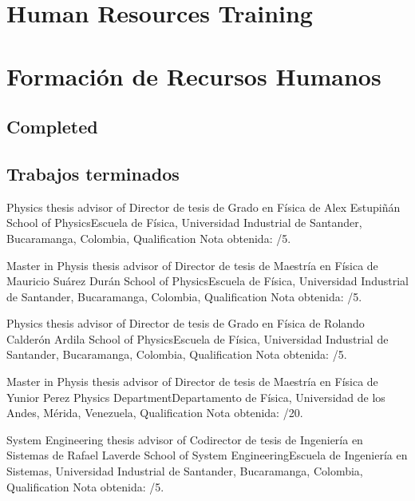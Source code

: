 \ifeng
\section*{Human Resources Training}
\else
\section*{Formación de Recursos Humanos}
\fi


\ifeng
\subsection*{Completed}
\else
\subsection*{Trabajos terminados}
\fi

\ifeng
Physics thesis advisor of
\else
Director de tesis de Grado en Física de
\fi
Alex Estupiñán \at \ifeng School of Physics\else Escuela de Física\fi, Universidad Industrial de Santander, Bucaramanga, Colombia, \ifeng Qualification \else Nota obtenida: /5.

\ifeng
Master in Physis thesis advisor of
\else
Director de tesis de Maestría en Física de
\fi
Mauricio Suárez Durán \at \ifeng School of Physics\else Escuela de Física\fi, Universidad Industrial de Santander, Bucaramanga, Colombia, \ifeng Qualification \else Nota obtenida: /5.

\ifeng
Physics thesis advisor of
\else
Director de tesis de Grado en Física de
\fi
Rolando Calderón Ardila \at  \ifeng School of Physics\else Escuela de Física\fi, Universidad Industrial de Santander, Bucaramanga, Colombia, \ifeng Qualification \else Nota obtenida: /5. 

\ifeng
Master in Physis thesis advisor of
\else
Director de tesis de Maestría en Física de
\fi
Yunior Perez \at \ifeng Physics Department\else Departamento de Física\fi, Universidad de los Andes, Mérida, Venezuela, \ifeng Qualification \else Nota obtenida: /20.

\ifeng
System Engineering thesis advisor of
\else
Codirector de tesis de Ingeniería en Sistemas de
\fi
Rafael Laverde \at \ifeng School of System Engineering\else Escuela de Ingeniería en Sistemas\fi, Universidad Industrial de Santander, Bucaramanga, Colombia, \ifeng Qualification \else Nota obtenida: /5.

